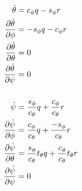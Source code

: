 \begin{align*}
  \\
  \dot{\theta} &= c_\phi q - s_\phi r \\
  \frac{\partial \dot{\theta}}{\partial \phi} &= -s_\phi q - c_\phi r \\
  \frac{\partial \dot{\theta}}{\partial \theta} &= 0 \\
  \frac{\partial \dot{\theta}}{\partial \psi} &= 0 \\
  \\
  \dot{\psi} &= \frac{s_\phi}{c_\theta} q + \frac{c_\phi}{c_\theta} r \\
  \frac{\partial \dot{\psi}}{\partial \phi} &= \frac{c_\phi}{c_\theta} q +
    \frac{-s_\phi}{c_\theta} r \\
  \frac{\partial \dot{\psi}}{\partial \theta} &= \frac{s_\phi}{c_\theta} t_\theta q +
  \frac{c_\phi}{c_\theta}t_\theta r \\
  \frac{\partial \dot{\psi}}{\partial \psi} &= 0 \\
\end{align*}

